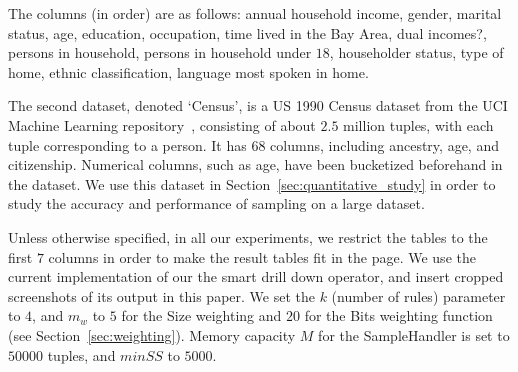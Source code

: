 The columns (in order) are as follows:
annual household income, gender, marital status, age, education, occupation, time lived in the Bay Area, dual incomes?, persons in household, persons in household under $18$, householder status, type of home, ethnic classification, language most spoken in home.

The second dataset, denoted `Census', is a US 1990 Census dataset from the UCI Machine Learning repository~\cite{uciml},
consisting of about $2.5$ million tuples, with each tuple corresponding to a person. It has $68$ columns, including ancestry, age, and citizenship. Numerical columns, such as age, have been bucketized beforehand in the dataset. We use this dataset in Section~\ref{sec:quantitative_study} in order to study the accuracy and performance of sampling on a large dataset.

Unless otherwise specified, in all our experiments, we restrict the tables to the first $7$ columns in order to make the result tables fit in the page. We use the current implementation of our the smart drill down operator, and insert cropped screenshots of its output in this paper. 
We set the $k$ (number of rules) parameter to $4$, and $m_w$ to $5$ for the Size weighting and $20$ for the Bits weighting function (see Section~\ref{sec:weighting}). Memory capacity $M$ for the SampleHandler is set to $50000$ tuples, and $minSS$ to $5000$.

